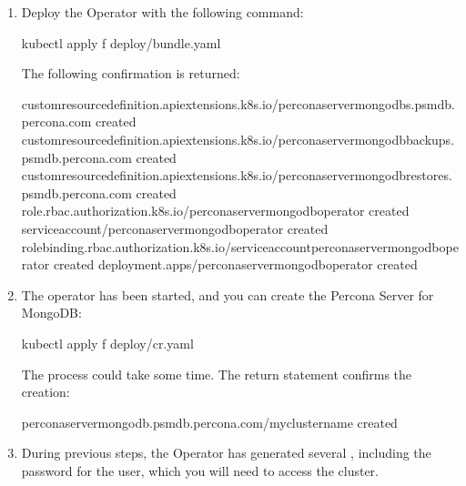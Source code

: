 \documentclass[letterpaper,10pt,english]{sphinxmanual}
\begin{document}
\begin{enumerate}
\item {} 
Deploy the Operator with the following command:

\begin{sphinxVerbatim}[commandchars=\\\{\}]
kubectl apply \PYGZhy{}f deploy/bundle.yaml
\end{sphinxVerbatim}

The following confirmation is returned:

\begin{sphinxVerbatim}[commandchars=\\\{\}]
customresourcedefinition.apiextensions.k8s.io/perconaservermongodbs.psmdb.percona.com created
customresourcedefinition.apiextensions.k8s.io/perconaservermongodbbackups.psmdb.percona.com created
customresourcedefinition.apiextensions.k8s.io/perconaservermongodbrestores.psmdb.percona.com created
role.rbac.authorization.k8s.io/percona\PYGZhy{}server\PYGZhy{}mongodb\PYGZhy{}operator created
serviceaccount/percona\PYGZhy{}server\PYGZhy{}mongodb\PYGZhy{}operator created
rolebinding.rbac.authorization.k8s.io/service\PYGZhy{}account\PYGZhy{}percona\PYGZhy{}server\PYGZhy{}mongodb\PYGZhy{}operator created
deployment.apps/percona\PYGZhy{}server\PYGZhy{}mongodb\PYGZhy{}operator created
\end{sphinxVerbatim}

\item {} 
The operator has been started, and you can create the Percona Server for MongoDB:

\begin{sphinxVerbatim}[commandchars=\\\{\}]
\PYGZdl{} kubectl apply \PYGZhy{}f deploy/cr.yaml
\end{sphinxVerbatim}

The process could take some time.
The return statement confirms the creation:

\begin{sphinxVerbatim}[commandchars=\\\{\}]
perconaservermongodb.psmdb.percona.com/my\PYGZhy{}cluster\PYGZhy{}name created
\end{sphinxVerbatim}

\item {} 
During previous steps, the Operator has generated several , including the password for the  user, which you will need to access the cluster.


\end{enumerate}
\end{document}
